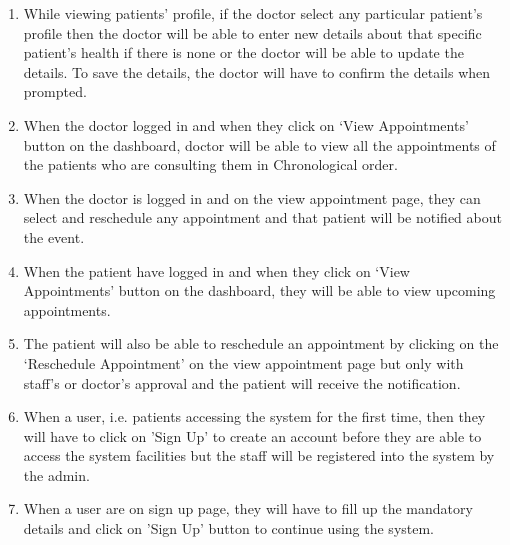 \documentclass[a4paper,12pt]{report}
\begin{document}
\begin{enumerate}
    \item While viewing patients’ profile, if the doctor select any particular patient’s profile then the doctor will be able to enter new details about that specific patient’s health if there is none or the doctor will be able to update the details. To save the details, the doctor will have to confirm the details when prompted.
    
    \item When the doctor logged in and when they click on ‘View Appointments’ button on the dashboard, doctor will be able to view all the appointments of the patients who are consulting them in Chronological order.
    
    \item When the doctor is logged in and on the view appointment page, they can select and reschedule any appointment and that patient will be notified about the event.
    
    \item When the patient have logged in and when they click on ‘View Appointments’ button on the dashboard, they will be able to view upcoming appointments. 
    
    \item The patient will also be able to reschedule an appointment by clicking on the ‘Reschedule Appointment’ on the view appointment page but only with staff’s or doctor’s approval and the patient will receive the notification.
    
    \item When a user, i.e. patients accessing the system for the first time, then they will have to click on 'Sign Up' to create an account before they are able to access the system facilities but the staff will be registered into the system by the admin.
    
    \item When a user are on sign up page, they will have to fill up the mandatory details and click on 'Sign Up' button to continue using the system.
    
    
\end{enumerate}

\end{document}
